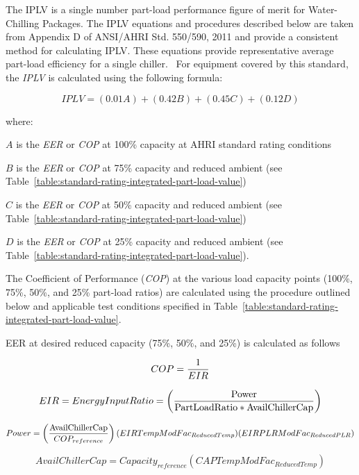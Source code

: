 The IPLV is a single number part-load performance figure of merit for Water-Chilling Packages. The IPLV equations and procedures described below are taken from Appendix D of ANSI/AHRI Std. 550/590, 2011 and provide a consistent method for calculating IPLV. These equations provide representative average part-load efficiency for a single chiller. ~For equipment covered by this standard, the \emph{IPLV} is calculated using the following formula:

\begin{equation}
IPLV = (0.01A) + (0.42B) + (0.45C) + (0.12D)
\end{equation}

where:

\(A\) is the \emph{EER} or \emph{COP} at 100\% capacity at AHRI standard rating conditions

\(B\) is the \emph{EER} or \emph{COP} at 75\% capacity and reduced ambient (see Table~\ref{table:standard-rating-integrated-part-load-value})

\(C\) is the \emph{EER} or \emph{COP} at 50\% capacity and reduced ambient (see Table~\ref{table:standard-rating-integrated-part-load-value})

\(D\) is the \emph{EER} or \emph{COP} at 25\% capacity and reduced ambient (see Table~\ref{table:standard-rating-integrated-part-load-value}).

The Coefficient of Performance (\emph{COP}) at the various load capacity points (100\%, 75\%, 50\%, and 25\% part-load ratios) are calculated using the procedure outlined below and applicable test conditions specified in Table~\ref{table:standard-rating-integrated-part-load-value}.

EER at desired reduced capacity (75\%, 50\%, and 25\%) is calculated as follows

\begin{equation}
COP = \frac{{\rm{1}}}{{EIR}}
\end{equation}

\begin{equation}
EIR = EnergyInputRatio = \left( {\frac{{{\rm{Power }}}}{{{\rm{PartLoadRatio * AvailChillerCap}}}}} \right)
\end{equation}

\begin{equation}
Power = \left( {\frac{{{\rm{AvailChillerCap}}}}{{CO{P_{reference}}}}} \right)(EIRTempModFa{c_{ReducedTemp}})(EIRPLRModFa{c_{ReducedPLR}})
\end{equation}

\begin{equation}
AvailChillerCap = Capacit{y_{reference}}(CAPTempModFa{c_{ReducedTemp}})
\end{equation}

